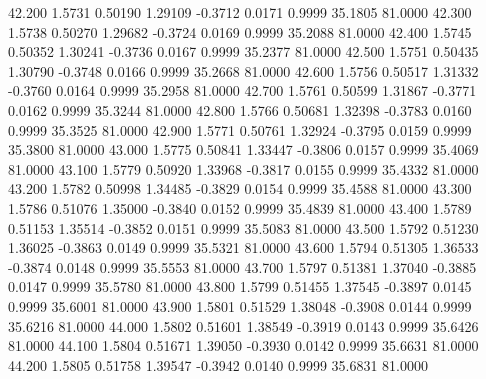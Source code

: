   42.200   1.5731   0.50190   1.29109  -0.3712   0.0171   0.9999  35.1805  81.0000
  42.300   1.5738   0.50270   1.29682  -0.3724   0.0169   0.9999  35.2088  81.0000
  42.400   1.5745   0.50352   1.30241  -0.3736   0.0167   0.9999  35.2377  81.0000
  42.500   1.5751   0.50435   1.30790  -0.3748   0.0166   0.9999  35.2668  81.0000
  42.600   1.5756   0.50517   1.31332  -0.3760   0.0164   0.9999  35.2958  81.0000
  42.700   1.5761   0.50599   1.31867  -0.3771   0.0162   0.9999  35.3244  81.0000
  42.800   1.5766   0.50681   1.32398  -0.3783   0.0160   0.9999  35.3525  81.0000
  42.900   1.5771   0.50761   1.32924  -0.3795   0.0159   0.9999  35.3800  81.0000
  43.000   1.5775   0.50841   1.33447  -0.3806   0.0157   0.9999  35.4069  81.0000
  43.100   1.5779   0.50920   1.33968  -0.3817   0.0155   0.9999  35.4332  81.0000
  43.200   1.5782   0.50998   1.34485  -0.3829   0.0154   0.9999  35.4588  81.0000
  43.300   1.5786   0.51076   1.35000  -0.3840   0.0152   0.9999  35.4839  81.0000
  43.400   1.5789   0.51153   1.35514  -0.3852   0.0151   0.9999  35.5083  81.0000
  43.500   1.5792   0.51230   1.36025  -0.3863   0.0149   0.9999  35.5321  81.0000
  43.600   1.5794   0.51305   1.36533  -0.3874   0.0148   0.9999  35.5553  81.0000
  43.700   1.5797   0.51381   1.37040  -0.3885   0.0147   0.9999  35.5780  81.0000
  43.800   1.5799   0.51455   1.37545  -0.3897   0.0145   0.9999  35.6001  81.0000
  43.900   1.5801   0.51529   1.38048  -0.3908   0.0144   0.9999  35.6216  81.0000
  44.000   1.5802   0.51601   1.38549  -0.3919   0.0143   0.9999  35.6426  81.0000
  44.100   1.5804   0.51671   1.39050  -0.3930   0.0142   0.9999  35.6631  81.0000
  44.200   1.5805   0.51758   1.39547  -0.3942   0.0140   0.9999  35.6831  81.0000
